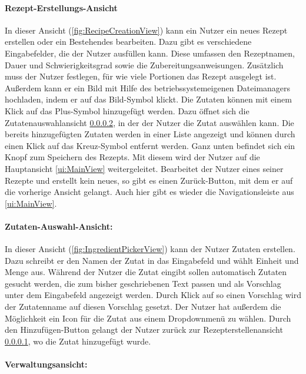 \documentclass[parskip=full]{scrartcl}
\begin{document}
\paragraph{Rezept-Erstellungs-Ansicht}
\label{ui:RecipeCreationView}
In dieser Ansicht (\autoref{fig:RecipeCreationView}) kann ein Nutzer ein neues Rezept erstellen oder ein Bestehendes bearbeiten. Dazu gibt es verschiedene Eingabefelder, die der Nutzer ausfüllen kann. Diese umfassen den Rezeptnamen, Dauer und Schwierigkeitsgrad sowie die Zubereitungsanweisungen. Zusätzlich muss der Nutzer festlegen, für wie viele Portionen das Rezept ausgelegt ist. Außerdem kann er ein Bild mit Hilfe des betriebssystemeigenen Dateimanagers hochladen, indem er auf das Bild-Symbol klickt.
Die Zutaten können mit einem Klick auf das Plus-Symbol hinzugefügt werden. Dazu öffnet sich die Zutatenauswahlansicht \ref{ui:IngredientPickerView}, in der der Nutzer die Zutat auswählen kann. Die bereits hinzugefügten Zutaten werden in einer Liste angezeigt und können durch einen Klick auf das Kreuz-Symbol entfernt werden. Ganz unten befindet sich ein Knopf zum Speichern des Rezepts. Mit diesem wird der Nutzer auf die Hauptansicht \ref{ui:MainView} weitergeleitet. Bearbeitet der Nutzer eines seiner Rezepte und erstellt kein neues, so gibt es einen Zurück-Button, mit dem er auf die vorherige Ansicht gelangt. Auch hier gibt es wieder die Navigationsleiste aus \ref{ui:MainView}.

\paragraph{Zutaten-Auswahl-Ansicht:}
\label{ui:IngredientPickerView}
In dieser Ansicht (\autoref{fig:IngredientPickerView}) kann der Nutzer Zutaten erstellen. Dazu schreibt er den Namen der Zutat in das Eingabefeld und wählt Einheit und Menge aus. Während der Nutzer die Zutat eingibt sollen automatisch Zutaten gesucht werden, die zum bisher geschriebenen Text passen und als Vorschlag unter dem Eingabefeld angezeigt werden. Durch Klick auf so einen Vorschlag wird der Zutatenname auf diesen Vorschlag gesetzt. Der Nutzer hat außerdem die Möglichkeit ein Icon für die Zutat aus einem Dropdownmenü zu wählen. Durch den Hinzufügen-Button gelangt der Nutzer zurück zur Rezepterstellenansicht \ref{ui:RecipeCreationView}, wo die Zutat hinzugefügt wurde.

\paragraph{Verwaltungsansicht:}
\label{ui:SettingsView}
\end{document}
